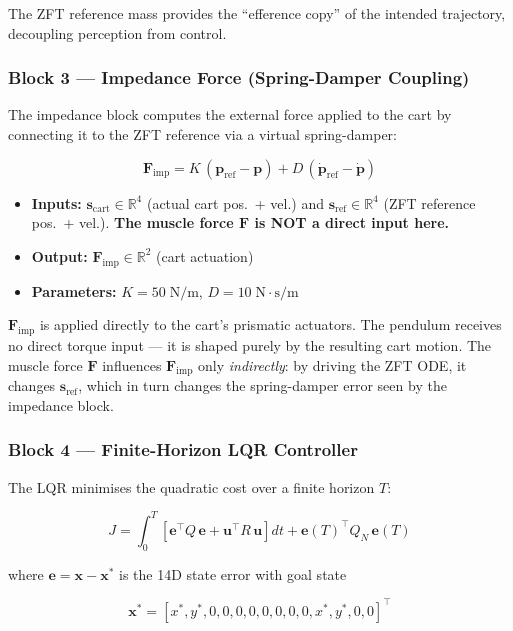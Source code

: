 \documentclass[11pt, a4paper]{article}
\begin{document}
The ZFT reference mass provides the ``efference copy'' of the intended
trajectory, decoupling perception from control.

\subsubsection*{Block 3 — Impedance Force (Spring-Damper Coupling)}

The impedance block computes the external force applied to the cart by
connecting it to the ZFT reference via a virtual spring-damper:

\[
\boxed{
\bm{F}_{\mathrm{imp}}
= K\,(\bm{p}_{\mathrm{ref}} - \bm{p})
+ D\,(\dot{\bm{p}}_{\mathrm{ref}} - \dot{\bm{p}})
}
\]

\begin{itemize}
  \item \textbf{Inputs:}
        $\bm{s}_{\mathrm{cart}} \in \mathbb{R}^4$ (actual cart pos.\ + vel.) and
        $\bm{s}_{\mathrm{ref}} \in \mathbb{R}^4$ (ZFT reference pos.\ + vel.).
        \textbf{The muscle force $\bm{F}$ is NOT a direct input here.}
  \item \textbf{Output:} $\bm{F}_{\mathrm{imp}} \in \mathbb{R}^2$ (cart actuation)
  \item \textbf{Parameters:} $K = 50\;\mathrm{N/m}$, $D = 10\;\mathrm{N\cdot s/m}$
\end{itemize}

$\bm{F}_{\mathrm{imp}}$ is applied directly to the cart's prismatic actuators.
The pendulum receives no direct torque input --- it is shaped purely by the
resulting cart motion.  The muscle force $\bm{F}$ influences $\bm{F}_{\mathrm{imp}}$
only \emph{indirectly}: by driving the ZFT ODE, it changes
$\bm{s}_{\mathrm{ref}}$, which in turn changes the spring-damper error seen
by the impedance block.

\subsubsection*{Block 4 — Finite-Horizon LQR Controller}

The LQR minimises the quadratic cost over a finite horizon $T$:

\[
\boxed{
J = \int_0^T \left[\bm{e}^{\top} Q\, \bm{e}
                 + \bm{u}^{\top} R\, \bm{u}\right] dt
  + \bm{e}(T)^{\top} Q_N\, \bm{e}(T)
}
\]

where $\bm{e} = \bm{x} - \bm{x}^{*}$ is the 14D state error with goal state

\[
\bm{x}^{*} =
[x^*, y^*, 0, 0, 0, 0, 0, 0, 0, 0, x^*, y^*, 0, 0]^{\top}
\]
\end{document}
